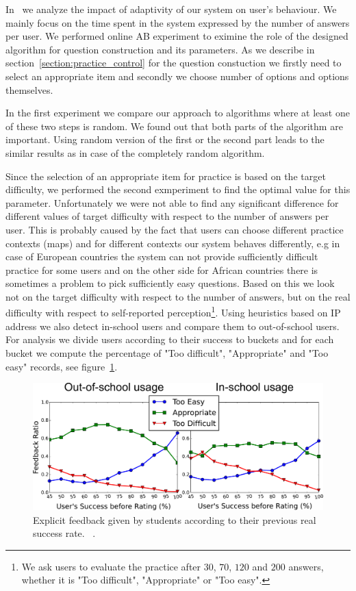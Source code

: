 \documentclass[table,color]{fithesis3/fithesis3}
\begin{document}
In~\cite{papousek2015impact} we analyze the impact of adaptivity of our system
on user's behaviour. We mainly focus on the time spent in the system expressed
by the number of answers per user. We performed online AB experiment to eximine
the role of the designed algorithm for question construction and its
parameters. As we describe in section~\ref{section:practice_control} for the
question constuction we firstly need to select an appropriate item and secondly
we choose number of options and options themselves.

In the first experiment we compare our approach to algorithms where at least
one of these two steps is random. We found out that both parts of the algorithm
are important. Using random version of the first or the second part leads to
the similar results as in case of the completely random algorithm.

Since the selection of an appropriate item for practice is based on the target
difficulty, we performed the second exmperiment to find the optimal value for
this parameter. Unfortunately we were not able to find any significant
difference for different values of target difficulty with respect to the number
of answers per user. This is probably caused by the fact that users can choose
different practice contexts (maps) and for different contexts our system
behaves differently, e.g in case of European countries the system can not
provide sufficiently difficult practice for some users and on the other side
for African countries there is sometimes a problem to pick sufficiently easy
questions. Based on this we look not on the target difficulty with respect to
the number of answers, but on the real difficulty with respect to self-reported
perception\footnote{We ask users to evaluate the practice after $30$, $70$,
$120$ and $200$ answers, whether it is "Too difficult", "Appropriate" or "Too
easy".}. Using heuristics based on IP address we also detect in-school users
and compare them to out-of-school users. For analysis we divide users according
to their success to buckets and for each bucket we compute the percentage of
"Too difficult", "Appropriate" and "Too easy" records, see
figure~\ref{figure:feedback_by_success}.

\begin{figure}[h]
	\begin{center}
		\includegraphics[width=\textwidth]{figure/feedback_by_success_overview}
		\caption{Explicit feedback given by students according to their previous
			real success rate. ~\cite{papousek2015impact}.}
		\label{figure:feedback_by_success}
	\end{center}
\end{figure}
\end{document}
